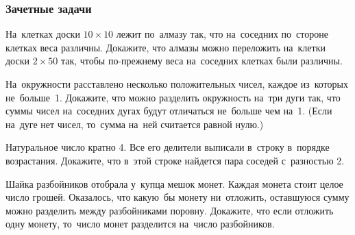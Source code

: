\subsubsection*{Зачетные задачи}

\begin{problems}

\item
На~клетках доски $10 \times 10$ лежит по~алмазу так, что на~соседних по~стороне
клетках веса различны.
Докажите, что алмазы можно переложить на~клетки доски $2 \times 50$ так, чтобы
по-прежнему веса на~соседних клетках были различны.

\item
На~окружности расставлено несколько положительных чисел, каждое из~которых
не~больше~1.
Докажите, что можно разделить окружность на~три дуги так, что суммы чисел
на~соседних дугах будут отличаться не~больше чем на~1.
(Если на~дуге нет чисел, то~сумма на~ней считается равной нулю.)

\item
Натуральное число кратно 4.
Все его делители выписали в~строку в~порядке возрастания.
Докажите, что в~этой строке найдется пара соседей с~разностью 2.

\item
Шайка разбойников отобрала у~купца мешок монет.
Каждая монета стоит целое число грошей.
Оказалось, что какую~бы монету ни~отложить, оставшуюся сумму можно разделить
между разбойниками поровну.
Докажите, что если отложить одну монету, то~число монет разделится на~число
разбойников.

\end{problems}


